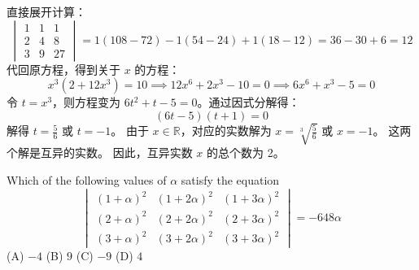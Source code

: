 \begin{questions}
\begin{solution}
\[\]
直接展开计算：
\[
\begin{vmatrix} 1 & 1 & 1 \\ 2 & 4 & 8 \\ 3 & 9 & 27 \end{vmatrix} = 1(108 - 72) - 1(54 - 24) + 1(18 - 12) = 36 - 30 + 6 = 12
\]
代回原方程，得到关于 $x$ 的方程：
\[
x^3 (2 + 12x^3) = 10 \implies 12x^6 + 2x^3 - 10 = 0 \implies 6x^6 + x^3 - 5 = 0
\]
令 $t = x^3$，则方程变为 $6t^2 + t - 5 = 0$。通过因式分解得：
\[
(6t - 5)(t + 1) = 0
\]
解得 $t = \frac{5}{6}$ 或 $t = -1$。
由于 $x \in \mathbb{R}$，对应的实数解为 $x = \sqrt[3]{\frac{5}{6}}$ 或 $x = -1$。
这两个解是互异的实数。
因此，互异实数 $x$ 的总个数为 2。
\end{solution}
\question Which of the following values of $\alpha$ satisfy the equation
\[
\begin{vmatrix}
(1+\alpha)^2 & (1+2\alpha)^2 & (1+3\alpha)^2 \\
(2+\alpha)^2 & (2+2\alpha)^2 & (2+3\alpha)^2 \\
(3+\alpha)^2 & (3+2\alpha)^2 & (3+3\alpha)^2
\end{vmatrix} = -648\alpha
\]
(A) $-4$
(B) $9$
(C) $-9$
(D) $4$


\end{questions}

